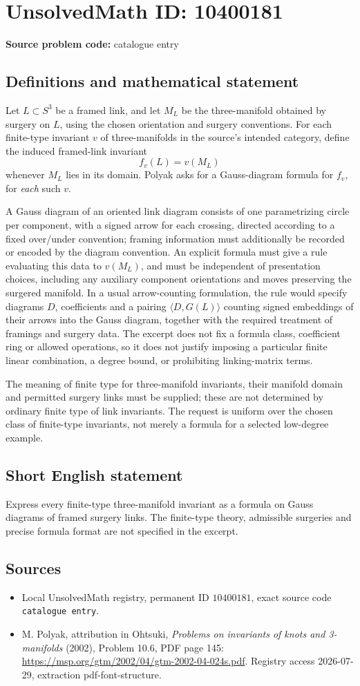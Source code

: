 \documentclass[11pt]{article}
\begin{document}
\section*{UnsolvedMath ID: 10400181}
\textbf{Source problem code:} catalogue entry
\subsection{Definitions and mathematical statement}
Let \(L\subset S^3\) be a framed link, and let \(M_L\) be the three-manifold obtained by surgery on \(L\), using the chosen orientation and surgery conventions. For each finite-type invariant \(v\) of three-manifolds in the source's intended category, define the induced framed-link invariant
\[f_v(L)=v(M_L)\]
whenever \(M_L\) lies in its domain. Polyak asks for a Gauss-diagram formula for \(f_v\), for \emph{each} such \(v\).

A Gauss diagram of an oriented link diagram consists of one parametrizing circle per component, with a signed arrow for each crossing, directed according to a fixed over/under convention; framing information must additionally be recorded or encoded by the diagram convention. An explicit formula must give a rule evaluating this data to \(v(M_L)\), and must be independent of presentation choices, including any auxiliary component orientations and moves preserving the surgered manifold. In a usual arrow-counting formulation, the rule would specify diagrams \(D\), coefficients and a pairing \(\langle D,G(L)\rangle\) counting signed embeddings of their arrows into the Gauss diagram, together with the required treatment of framings and surgery data. The excerpt does not fix a formula class, coefficient ring or allowed operations, so it does not justify imposing a particular finite linear combination, a degree bound, or prohibiting linking-matrix terms.

The meaning of finite type for three-manifold invariants, their manifold domain and permitted surgery links must be supplied; these are not determined by ordinary finite type of link invariants. The request is uniform over the chosen class of finite-type invariants, not merely a formula for a selected low-degree example.
\subsection{Short English statement}
Express every finite-type three-manifold invariant as a formula on Gauss diagrams of framed surgery links. The finite-type theory, admissible surgeries and precise formula format are not specified in the excerpt.
\subsection{Sources}
\begin{itemize}
\item Local UnsolvedMath registry, permanent ID \(10400181\), exact source code \texttt{catalogue entry}.
\item M. Polyak, attribution in Ohtsuki, \emph{Problems on invariants of knots and 3-manifolds} (2002), Problem 10.6, PDF page 145: \url{https://msp.org/gtm/2002/04/gtm-2002-04-024s.pdf}. Registry access 2026-07-29, extraction pdf-font-structure.
\end{itemize}
\end{document}
